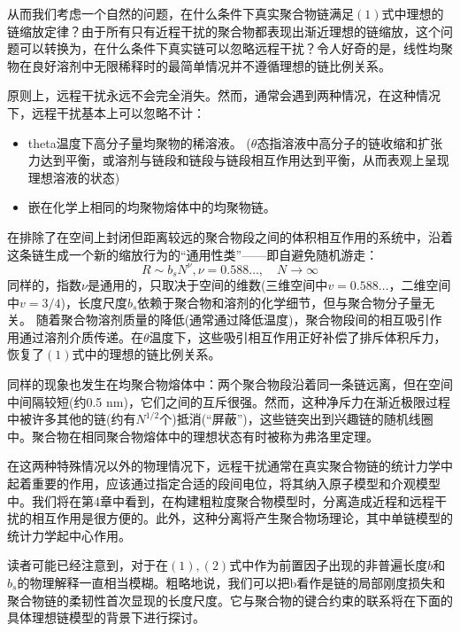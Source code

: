 从而我们考虑一个自然的问题，在什么条件下真实聚合物链满足$(1)$式中理想的链缩放定律？由于所有只有近程干扰的聚合物都表现出渐近理想的链缩放，这个问题可以转换为，在什么条件下真实链可以忽略远程干扰？令人好奇的是，线性均聚物在良好溶剂中无限稀释时的最简单情况并不遵循理想的链比例关系。

原则上，远程干扰永远不会完全消失。然而，通常会遇到两种情况，在这种情况下，远程干扰基本上可以忽略不计：
\begin{itemize}
	\item theta温度下高分子量均聚物的稀溶液。
	($\theta$态指溶液中高分子的链收缩和扩张力达到平衡，或溶剂与链段和链段与链段相互作用达到平衡，从而表观上呈现理想溶液的状态)
	\item 嵌在化学上相同的均聚物熔体中的均聚物链。
\end{itemize}

在排除了在空间上封闭但距离较远的聚合物段之间的体积相互作用的系统中，沿着这条链生成一个新的缩放行为的“通用性类”——即自避免随机游走：
\begin{equation}
R \sim b _ { s } N ^ { \nu } , \nu = 0.588 \ldots , \quad N \rightarrow \infty
\end{equation}
同样的，指数$\nu$是通用的，只取决于空间的维数(三维空间中$ v = 0.588 \dots$，二维空间中$ v =3/4 $)，长度尺度$b_s$依赖于聚合物和溶剂的化学细节，但与聚合物分子量无关。
随着聚合物溶剂质量的降低(通常通过降低温度)，聚合物段间的相互吸引作用通过溶剂介质传递。在$\theta$温度下，这些吸引相互作用正好补偿了排斥体积斥力，恢复了$(1)$式中的理想的链比例关系。

同样的现象也发生在均聚合物熔体中：两个聚合物段沿着同一条链远离，但在空间中间隔较短(约0.5 nm)，它们之间的互斥很强。然而，这种净斥力在渐近极限过程中被许多其他的链(约有$N^{1/2}$个)抵消(“屏蔽”)，这些链突出到兴趣链的随机线圈中。聚合物在相同聚合物熔体中的理想状态有时被称为弗洛里定理。

在这两种特殊情况以外的物理情况下，远程干扰通常在真实聚合物链的统计力学中起着重要的作用，应该通过指定合适的段间电位，将其纳入原子模型和介观模型中。我们将在第4章中看到，在构建粗粒度聚合物模型时，分离造成近程和远程干扰的相互作用是很方便的。此外，这种分离将产生聚合物场理论，其中单链模型的统计力学起中心作用。

读者可能已经注意到，对于在$(1),(2)$式中作为前置因子出现的非普遍长度$b$和$b_s$的物理解释一直相当模糊。粗略地说，我们可以把b看作是链的局部刚度损失和聚合物链的柔韧性首次显现的长度尺度。它与聚合物的键合约束的联系将在下面的具体理想链模型的背景下进行探讨。
